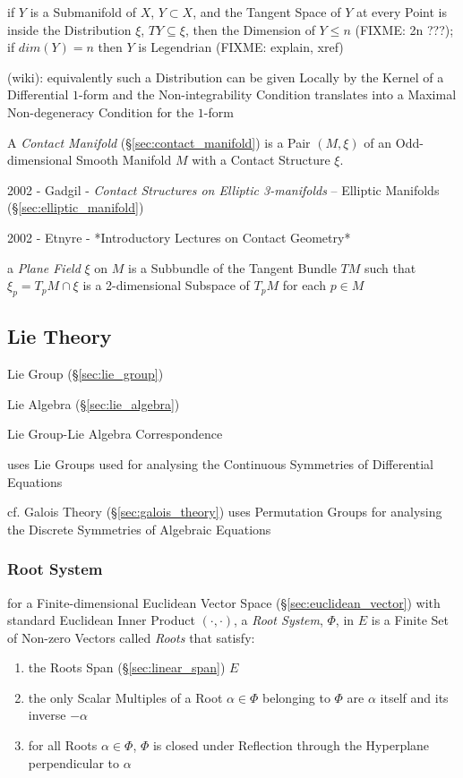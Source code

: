 if $Y$ is a Submanifold of $X$, $Y \subset X$, and the Tangent Space of $Y$ at
every Point is inside the Distribution $\xi$, $T Y \subseteq \xi$, then the
Dimension of $Y \leq n$ (FIXME: 2n ???); if $dim(Y) = n$ then $Y$ is Legendrian
(FIXME: explain, xref)

(wiki): equivalently such a Distribution can be given Locally by the Kernel of
a Differential $1$-form and the Non-integrability Condition translates into a
Maximal Non-degeneracy Condition for the $1$-form

A \emph{Contact Manifold} (\S\ref{sec:contact_manifold}) is a Pair $(M,\xi)$ of
an Odd-dimensional Smooth Manifold $M$ with a Contact Structure $\xi$.

2002 - Gadgil - \emph{Contact Structures on Elliptic 3-manifolds}
-- Elliptic Manifolds (\S\ref{sec:elliptic_manifold})

2002 - Etnyre - *Introductory Lectures on Contact Geometry*

a \emph{Plane Field} $\xi$ on $M$ is a Subbundle of the Tangent Bundle $TM$
such that $\xi_p = T_p M \cap \xi$ is a 2-dimensional Subspace of $T_pM$ for
each $p \in M$



\subsection{Lie Theory}\label{sec:lie_theory}

Lie Group (\S\ref{sec:lie_group})

Lie Algebra (\S\ref{sec:lie_algebra})

Lie Group-Lie Algebra Correspondence

uses Lie Groups used for analysing the Continuous Symmetries of
Differential Equations %

cf. Galois Theory (\S\ref{sec:galois_theory}) uses Permutation Groups
for analysing the Discrete Symmetries of Algebraic Equations %



\subsubsection{Root System}\label{sec:root_system}

for a Finite-dimensional Euclidean Vector Space (\S\ref{sec:euclidean_vector})
with standard Euclidean Inner Product $(\cdot,\cdot)$, a \emph{Root System},
$\Phi$, in $E$ is a Finite Set of Non-zero Vectors called \emph{Roots} that
satisfy:
\begin{enumerate}
  \item the Roots Span (\S\ref{sec:linear_span}) $E$
  \item the only Scalar Multiples of a Root $\alpha \in \Phi$ belonging to
    $\Phi$ are $\alpha$ itself and its inverse $-\alpha$
  \item for all Roots $\alpha \in \Phi$, $\Phi$ is closed under Reflection
    through the Hyperplane perpendicular to $\alpha$
\end{enumerate}

